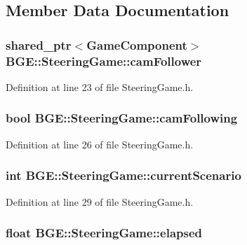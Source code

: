 \subsection{Member Data Documentation}
\hypertarget{class_b_g_e_1_1_steering_game_a35af13959fa40a2ddea87f2128f36db0}{
\subsubsection[{cam\-Follower}]{\setlength{\rightskip}{0pt plus 5cm}shared\-\_\-ptr$<${\bf Game\-Component}$>$ B\-G\-E\-::\-Steering\-Game\-::cam\-Follower}}\label{class_b_g_e_1_1_steering_game_a35af13959fa40a2ddea87f2128f36db0}


Definition at line 23 of file Steering\-Game.\-h.

\hypertarget{class_b_g_e_1_1_steering_game_a7aad64bdb402cbb6a37c74d2f7aed290}{
\subsubsection[{cam\-Following}]{\setlength{\rightskip}{0pt plus 5cm}bool B\-G\-E\-::\-Steering\-Game\-::cam\-Following}}\label{class_b_g_e_1_1_steering_game_a7aad64bdb402cbb6a37c74d2f7aed290}


Definition at line 26 of file Steering\-Game.\-h.

\hypertarget{class_b_g_e_1_1_steering_game_aa84a9a6d13bc47b1ee1fd933678735f9}{
\subsubsection[{current\-Scenario}]{\setlength{\rightskip}{0pt plus 5cm}int B\-G\-E\-::\-Steering\-Game\-::current\-Scenario}}\label{class_b_g_e_1_1_steering_game_aa84a9a6d13bc47b1ee1fd933678735f9}


Definition at line 29 of file Steering\-Game.\-h.

\hypertarget{class_b_g_e_1_1_steering_game_aface673df656d6c4c1483e50d87cc263}{
\subsubsection[{elapsed}]{\setlength{\rightskip}{0pt plus 5cm}float B\-G\-E\-::\-Steering\-Game\-::elapsed}}\label{class_b_g_e_1_1_steering_game_aface673df656d6c4c1483e50d87cc263}


